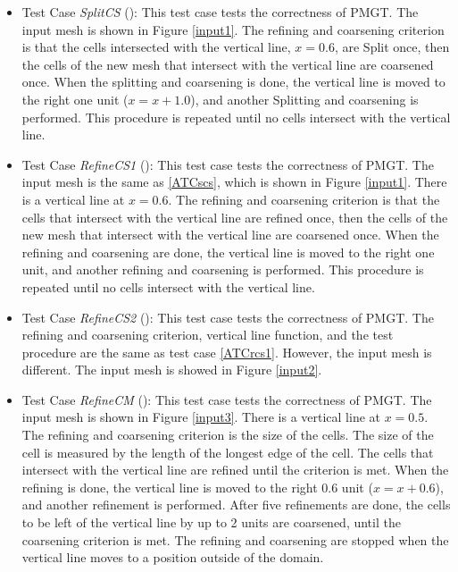 \documentclass[12pt,titlepage]{article}
\begin{document}
\begin{itemize}
\item Test Case {\em SplitCS} (\cthecasenum \label{ATCscs}): This test case tests the correctness of PMGT. The input mesh is shown in Figure \ref{input1}. The refining and coarsening criterion is that the cells intersected with the vertical line, $x=0.6$, are Split once, then the cells of the new mesh that intersect with the vertical line are coarsened once. When the splitting and coarsening is done, the vertical line is moved to the right one unit ($x=x+1.0$), and another Splitting and coarsening is performed. This procedure is repeated until no cells intersect with the vertical line. 

\item Test Case {\em RefineCS1} (\cthecasenum \label{ATCrcs1}): This test case tests the correctness of PMGT. The input mesh is the same as \cref{ATCscs}, which is shown in Figure \ref{input1}. There is a vertical line at $x = 0.6$. The refining and coarsening criterion is that the cells that intersect with the vertical line are refined once, then the cells of the new mesh that intersect with the vertical line are coarsened once. When the refining and coarsening are done, the vertical line is moved to the right one unit, and another refining and coarsening is performed. This procedure is repeated until no cells intersect with the vertical line. 

\item Test Case {\em RefineCS2} (\cthecasenum \label{ATCrcs2}): This test case tests the correctness of PMGT. The refining and coarsening criterion, vertical line function, and the test procedure are the same as test case \cref{ATCrcs1}. However, the input mesh is different. The input mesh is showed in Figure \ref{input2}. 

\item Test Case {\em RefineCM} (\cthecasenum \label{ATCrcm}): This test case tests the correctness of PMGT. The input mesh is shown in Figure \ref{input3}. There is a vertical line at $x = 0.5$. The refining and coarsening criterion is the size of the cells. The size of the cell is measured by the length of the longest edge of the cell. The cells that intersect with the vertical line are refined until the criterion is met. When the refining is done, the vertical line is moved to the right $0.6$ unit ($x=x+0.6$), and another refinement is performed. After five refinements are done, the cells to be left of the vertical line by up to 2 units are coarsened, until the coarsening criterion is met. The refining and coarsening are stopped when the vertical line moves to a position outside of the domain. 


\end{itemize}
\end{document}
